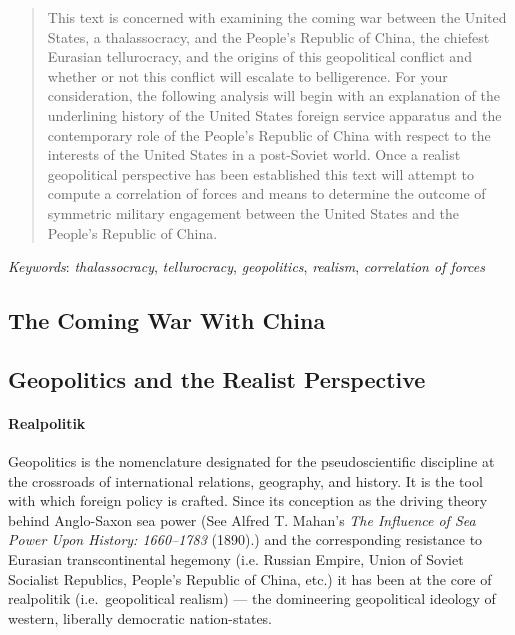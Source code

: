 \documentclass[12pt]{article}
\date{}
\author{\normalsize \textbf{The Coming War With China}\\\normalsize  \censor{\textsc{Michael D. Brodskiy}}\\\normalsize  Department of Political Science, Diablo Valley College\\\normalsize  POLSC-250: International Relations\\\normalsize  Professor Kropf\\\normalsize  July 22, 2021}
\begin{document}
\maketitle

\newpage

\begin{abstract}
  \hspace{-17.5pt}This text is concerned with examining the coming war between the United States, a thalassocracy, and the People's Republic of China, the chiefest Eurasian tellurocracy, and the origins of this geopolitical conflict and whether or not this conflict will escalate to belligerence. For your consideration, the following analysis will begin with an explanation of the underlining history of the United States foreign service apparatus and the contemporary role of the People's Republic of China with respect to the interests of the United States in a post-Soviet world. Once a realist geopolitical perspective has been established this text will attempt to compute a correlation of forces and means to determine the outcome of symmetric military engagement between the United States and the People's Republic of China. 
\end{abstract}

\emph{Keywords}: \textit{thalassocracy}, \textit{tellurocracy}, \textit{geopolitics}, \textit{realism}, \textit{correlation of forces}

\newpage

\tableofcontents
\listoffigures

\newpage

\begin{center}
\section{\normalsize The Coming War With China}
\end{center}

\begin{center}
\subsection{\normalsize Geopolitics and the Realist Perspective}
\end{center}
\paragraph{Realpolitik} Geopolitics is the nomenclature designated for the pseudoscientific discipline at the crossroads of international relations, geography, and history. It is the tool with which foreign policy is crafted. Since its conception as the driving theory behind Anglo-Saxon sea power (See Alfred T. Mahan's \emph{The Influence of Sea Power Upon History: 1660–1783} (1890).) and the corresponding resistance to Eurasian transcontinental hegemony (i.e. Russian Empire, Union of Soviet Socialist Republics, People's Republic of China, etc.) it has been at the core of realpolitik (i.e.\ geopolitical realism) — the domineering geopolitical ideology of western, liberally democratic nation-states.
\end{document}
